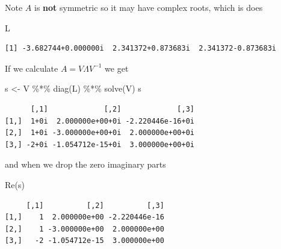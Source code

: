 \documentclass[
  letterpaper,
]{book}
\newenvironment{Shaded}{\begin{snugshade}}{\end{snugshade}}
\newcommand{\CommentTok}[1]{\textcolor[rgb]{0.37,0.37,0.37}{#1}}
\newcommand{\FunctionTok}[1]{\textcolor[rgb]{0.28,0.35,0.67}{#1}}
\newcommand{\NormalTok}[1]{\textcolor[rgb]{0.00,0.23,0.31}{#1}}
\newcommand{\OtherTok}[1]{\textcolor[rgb]{0.00,0.23,0.31}{#1}}
\newcommand{\SpecialCharTok}[1]{\textcolor[rgb]{0.37,0.37,0.37}{#1}}
\begin{document}
\begin{Shaded}
\end{Shaded}

Note \(A\) is \textbf{not} symmetric so it may have complex roots, which
is does

\begin{Shaded}
\begin{Highlighting}[]
\NormalTok{L}
\end{Highlighting}
\end{Shaded}

\begin{verbatim}
[1] -3.682744+0.000000i  2.341372+0.873683i  2.341372-0.873683i
\end{verbatim}

If we calculate \(A = V\Lambda V^{-1}\) we get

\begin{Shaded}
\begin{Highlighting}[]
\NormalTok{s }\OtherTok{\textless{}{-}}\NormalTok{ V }\SpecialCharTok{\%*\%} \FunctionTok{diag}\NormalTok{(L) }\SpecialCharTok{\%*\%} \FunctionTok{solve}\NormalTok{(V)}
\NormalTok{s}
\end{Highlighting}
\end{Shaded}

\begin{verbatim}
      [,1]             [,2]             [,3]
[1,]  1+0i  2.000000e+00+0i -2.220446e-16+0i
[2,]  1+0i -3.000000e+00+0i  2.000000e+00+0i
[3,] -2+0i -1.054712e-15+0i  3.000000e+00+0i
\end{verbatim}

and when we drop the zero imaginary parts

\begin{Shaded}
\begin{Highlighting}[]
\FunctionTok{Re}\NormalTok{(s)}
\end{Highlighting}
\end{Shaded}

\begin{verbatim}
     [,1]          [,2]          [,3]
[1,]    1  2.000000e+00 -2.220446e-16
[2,]    1 -3.000000e+00  2.000000e+00
[3,]   -2 -1.054712e-15  3.000000e+00
\end{verbatim}
\end{document}

